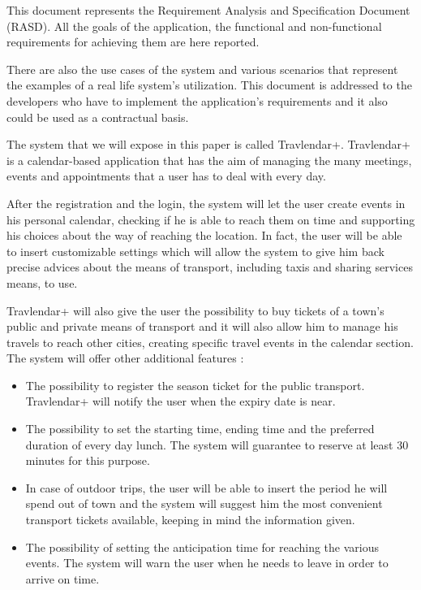 \vspace*{-5mm}

This document represents the Requirement Analysis and Specification Document (RASD).
All the goals of the application, the functional and non-functional requirements for achieving them are here reported.\par
There are also the use cases of the system and various scenarios that represent the examples of a real life system’s utilization.
This document is addressed to the developers who have to implement the application’s requirements and it also could be used as a contractual basis.

The system that we will expose in this paper is called Travlendar+. 
Travlendar+ is a calendar-based application that has the aim of managing the many meetings, events and appointments that a user has to deal with every day.\par
After the registration and the login, the system will let the user create events in his personal calendar, checking if he is able to reach them on time and supporting his choices about the way of reaching the location. In fact, the user will be able to insert customizable settings which will allow the system to give him back precise advices about the means of transport, including taxis and sharing services means, to use.\par
Travlendar+ will also give the user the possibility to buy tickets of a town’s public and private means of transport and it will also allow him to manage his travels to reach other cities, creating specific travel events in the calendar section.
The system will offer other additional features :
\begin{itemize}
	\setlength{\leftskip}{0.5cm}
	\item The possibility to register the season ticket for the public transport. Travlendar+ will notify the user when the expiry date is near.
	\item The possibility to set the starting time, ending time and the preferred duration of every day lunch. The system will guarantee to reserve at least 30 minutes for this purpose.
	\item In case of outdoor trips, the user will be able to insert the period he will spend out of town and the system will suggest him the most convenient transport tickets available, keeping in mind the information given.
	\item The possibility of setting the anticipation time for reaching the various events. The system will warn the user when he needs to leave in order to arrive on time.
\end{itemize}

